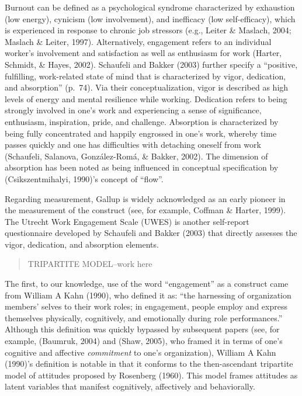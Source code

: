 \documentclass[
  english,
  man]{apa6}
\begin{document}
Burnout can be defined as a psychological syndrome characterized by exhaustion (low energy), cynicism (low involvement), and inefficacy (low self-efficacy), which is experienced in response to chronic job stressors (e.g., Leiter \& Maslach, 2004; Maslach \& Leiter, 1997). Alternatively, engagement refers to an individual worker's involvement and satisfaction as well as enthusiasm for work (Harter, Schmidt, \& Hayes, 2002). Schaufeli and Bakker (2003) further specify a \enquote{positive, fulfilling, work-related state of mind that is characterized by vigor, dedication, and absorption} (p.~74). Via their conceptualization, vigor is described as high levels of energy and mental resilience while working. Dedication refers to being strongly involved in one's work and experiencing a sense of significance, enthusiasm, inspiration, pride, and challenge. Absorption is characterized by being fully concentrated and happily engrossed in one's work, whereby time passes quickly and one has difficulties with detaching oneself from work (Schaufeli, Salanova, González-Romá, \& Bakker, 2002). The dimension of absorption has been noted as being influenced in conceptual specification by (Csikszentmihalyi, 1990)'s concept of \enquote{flow}.

Regarding measurement, Gallup is widely acknowledged as an early pioneer in the measurement of the construct (see, for example, Coffman \& Harter, 1999). The Utrecht Work Engagement Scale (UWES) is another self-report questionnaire developed by Schaufeli and Bakker (2003) that directly assesses the vigor, dedication, and absorption elements.

\begin{quote}
TRIPARTITE MODEL--work here
\end{quote}

The first, to our knowledge, use of the word \enquote{engagement} as a construct came from William A Kahn (1990), who defined it as: \enquote{the harnessing of organization members' selves to their work roles; in engagement, people employ and express themselves physically, cognitively, and emotionally during role performances.} Although this definition was quickly bypassed by subsequent papers (see, for example, (Baumruk, 2004) and (Shaw, 2005), who framed it in terms of one's cognitive and affective \emph{commitment} to one's organization), William A Kahn (1990)'s definition is notable in that it conforms to the then-ascendant tripartite model of attitudes proposed by Rosenberg (1960). This model frames attitudes as latent variables that manifest cognitively, affectively and behaviorally.
\end{document}
